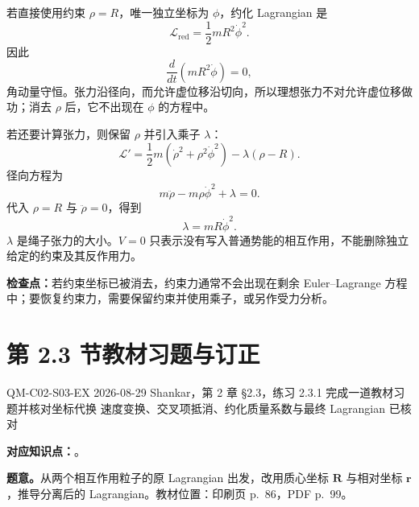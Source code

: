 \begin{checkedsolution}
若直接使用约束 $\rho=R$，唯一独立坐标为 $\phi$，约化 Lagrangian 是
\begin{equation}
  \mathcal L_{\mathrm{red}}=\frac12mR^2\dot\phi^2.
  \label{eq:QM-C02-S02-E02-reduced-lagrangian}
\end{equation}
因此
\[
  \frac{d}{dt}(mR^2\dot\phi)=0,
\]
角动量守恒。张力沿径向，而允许虚位移沿切向，所以理想张力不对允许虚位移做功；消去 $\rho$ 后，它不出现在 $\phi$ 的方程中。

若还要计算张力，则保留 $\rho$ 并引入乘子 $\lambda$：
\begin{equation}
  \mathcal L'
  =\frac12m(\dot\rho^2+\rho^2\dot\phi^2)
  -\lambda(\rho-R).
  \label{eq:QM-C02-S02-E02-multiplier-lagrangian}
\end{equation}
径向方程为
\[
  m\ddot\rho-m\rho\dot\phi^2+\lambda=0.
\]
代入 $\rho=R$ 与 $\ddot\rho=0$，得到
\begin{equation}
  \boxed{\lambda=mR\dot\phi^2.}
  \label{eq:QM-C02-S02-E02-tension}
\end{equation}
$\lambda$ 是绳子张力的大小。$V=0$ 只表示没有写入普通势能的相互作用，不能删除独立给定的约束及其反作用力。
\end{checkedsolution}

\textbf{检查点：}若约束坐标已被消去，约束力通常不会出现在剩余 Euler--Lagrange 方程中；要恢复约束力，需要保留约束并使用乘子，或另作受力分析。

\section{第 2.3 节教材习题与订正}
\label{exercise-set:QM-C02-S03}

\exercisemeta
  {QM-C02-S03-EX}
  {2026-08-29}
  {Shankar，第 2 章 \S 2.3，练习 2.3.1}
  {完成一道教材习题并核对坐标代换}
  {速度变换、交叉项抵消、约化质量系数与最终 Lagrangian 已核对}


\textbf{对应知识点：}。

\textbf{题意。}从两个相互作用粒子的原 Lagrangian 出发，改用质心坐标 $\bm R$ 与相对坐标 $\bm r$，推导分离后的 Lagrangian。教材位置：印刷页 p.~86，PDF p.~99。

